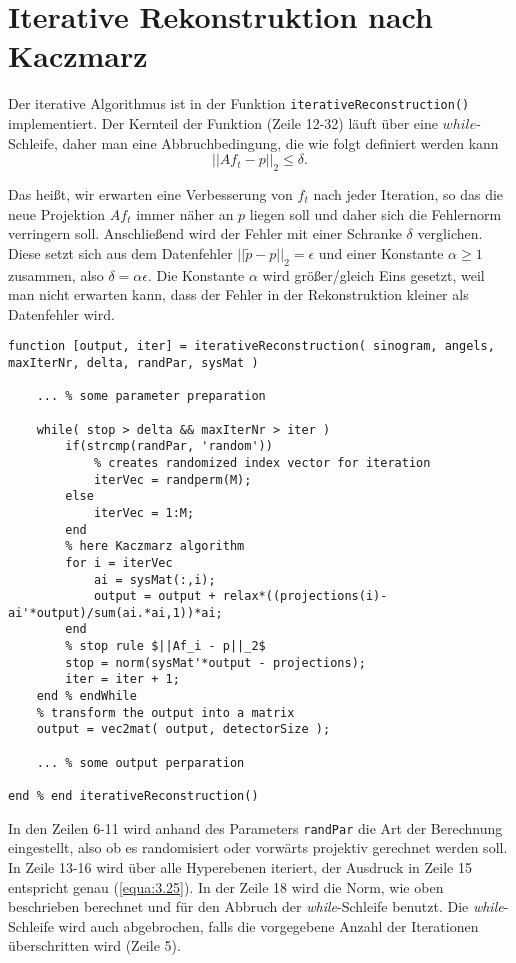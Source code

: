 \section{Iterative Rekonstruktion nach Kaczmarz}
\label{cha:A.5}

Der iterative Algorithmus ist in der Funktion \verb|iterativeReconstruction()| implementiert. Der Kernteil der Funktion (Zeile 12-32) läuft über eine $while$-Schleife, daher man eine Abbruchbedingung, die wie folgt definiert werden kann
\begin{equation} 
	||Af_t - p ||_2 \leq \delta. 
	\label{equa:A.1}
\end{equation}

Das heißt, wir erwarten eine Verbesserung von $f_t$ nach jeder Iteration, so das die neue Projektion $Af_t$ immer näher an $p$ liegen soll und daher sich die Fehlernorm verringern soll. Anschließend wird der Fehler mit einer Schranke $\delta$ verglichen. Diese setzt sich aus dem Datenfehler $|| \tilde{p} - p ||_2 = \epsilon$ und einer Konstante $\alpha \geq 1$ zusammen, also $\delta = \alpha\epsilon$. Die Konstante $\alpha$ wird größer/gleich Eins gesetzt, weil man nicht erwarten kann, dass der Fehler in der Rekonstruktion kleiner als Datenfehler wird. 

\begin{lstlisting}[style=Matlab-editor,basicstyle=\color{black}\ttfamily\footnotesize, backgroundcolor=\color{white}]
function [output, iter] = iterativeReconstruction( sinogram, angels, maxIterNr, delta, randPar, sysMat )

	... % some parameter preparation
	
	while( stop > delta && maxIterNr > iter )      
		if(strcmp(randPar, 'random'))
			% creates randomized index vector for iteration
			iterVec = randperm(M);
		else
			iterVec = 1:M;
		end		
		% here Kaczmarz algorithm
		for i = iterVec
			ai = sysMat(:,i); 
			output = output + relax*((projections(i)-ai'*output)/sum(ai.*ai,1))*ai;            
		end  
		% stop rule $||Af_i - p||_2$
		stop = norm(sysMat'*output - projections);       
		iter = iter + 1;               
	end % endWhile
	% transform the output into a matrix
	output = vec2mat( output, detectorSize );
	
	... % some output perparation
	
end % end iterativeReconstruction()
\end{lstlisting}
\vspace{12pt}
In den Zeilen 6-11 wird anhand des Parameters \verb|randPar| die Art der Berechnung eingestellt, also ob es randomisiert oder vorwärts projektiv gerechnet werden soll. In Zeile 13-16 wird über alle Hyperebenen iteriert, der Ausdruck in Zeile 15 entspricht genau (\ref{equa:3.25}). In der Zeile 18 wird die Norm, wie oben beschrieben berechnet und für den Abbruch der \textit{while}-Schleife benutzt. Die \textit{while}-Schleife wird auch abgebrochen, falls die vorgegebene Anzahl der Iterationen überschritten wird (Zeile 5).


